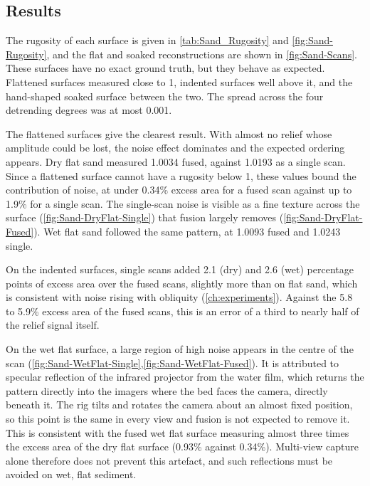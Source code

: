 

\subsection{Results}
The rugosity of each surface is given in \autoref{tab:Sand_Rugosity} and \autoref{fig:Sand-Rugosity}, and the flat and soaked reconstructions are shown in \autoref{fig:Sand-Scans}. These surfaces have no exact ground truth, but they behave as expected. Flattened surfaces measured close to 1, indented surfaces well above it, and the hand-shaped soaked surface between the two. The spread across the four detrending degrees was at most 0.001.

The flattened surfaces give the clearest result. With almost no relief whose amplitude could be lost, the noise effect dominates and the expected ordering appears. Dry flat sand measured 1.0034 fused, against 1.0193 as a single scan. Since a flattened surface cannot have a rugosity below 1, these values bound the contribution of noise, at under 0.34\% excess area for a fused scan against up to 1.9\% for a single scan. The single-scan noise is visible as a fine texture across the surface (\autoref{fig:Sand-DryFlat-Single}) that fusion largely removes (\autoref{fig:Sand-DryFlat-Fused}). Wet flat sand followed the same pattern, at 1.0093 fused and 1.0243 single.

On the indented surfaces, single scans added 2.1 (dry) and 2.6 (wet) percentage points of excess area over the fused scans, slightly more than on flat sand, which is consistent with noise rising with obliquity (\autoref{ch:experiments}). Against the 5.8 to 5.9\% excess area of the fused scans, this is an error of a third to nearly half of the relief signal itself.

On the wet flat surface, a large region of high noise appears in the centre of the scan (\autoref{fig:Sand-WetFlat-Single},\autoref{fig:Sand-WetFlat-Fused}). It is attributed to specular reflection of the infrared projector from the water film, which returns the pattern directly into the imagers where the bed faces the camera, directly beneath it. The rig tilts and rotates the camera about an almost fixed position, so this point is the same in every view and fusion is not expected to remove it. This is consistent with the fused wet flat surface measuring almost three times the excess area of the dry flat surface (0.93\% against 0.34\%). Multi-view capture alone therefore does not prevent this artefact, and such reflections must be avoided on wet, flat sediment.

